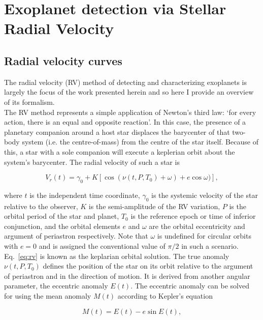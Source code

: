 \section{Exoplanet detection via Stellar Radial Velocity} \label{sect:rv}
\subsection{Radial velocity curves}
The radial velocity (RV) method of detecting and characterizing exoplanets is largely
the focus of the work presented herein and so here I provide an overview of its formalism. \\

The RV method represents a simple 
application of Newton's third law: `for every action, there is an equal 
and opposite reaction'. In this case, the presence of a planetary companion around a 
host star displaces the barycenter of that two-body system (i.e. the centre-of-mass) from the
centre of the star itself. Because of this, a star with a sole companion 
will execute a keplerian orbit about the system's barycenter. The radial velocity of such a star
is

\begin{equation}
V_r(t) = \gamma_0 + K[\cos{(\nu(t,P,T_0) + \omega)} + e\cos{\omega})],
\label{eq:rv}
\end{equation}

\noindent where $t$ is the independent time coordinate, $\gamma_0$ is the systemic velocity of
the star relative to the observer, $K$ is the semi-amplitude of the RV variation,
$P$ is the orbital period of the star and planet, 
$T_0$ is the reference epoch or time of inferior conjunction, and
the orbital elements $e$ and $\omega$ are the orbital eccentricity and argument of
periastron respectively. Note that $\omega$ is undefined for circular orbits with
$e=0$ and is assigned the conventional value of $\pi/2$ in such a scenario.
Eq.~\ref{eq:rv} is known as the keplarian orbital solution.
The true anomaly $\nu(t,P,T_0)$ defines the position of the star on its orbit 
relative to the argument of periastron and in the direction of motion. It is derived 
from another angular parameter, the eccentric anomaly $E(t)$. The eccentric 
anomaly can be solved for using the mean anomaly $M(t)$ according to 
Kepler's equation

\begin{equation}
M(t) = E(t)-e\sin{E(t)},
\label{eq:kepler} 
\end{equation}


